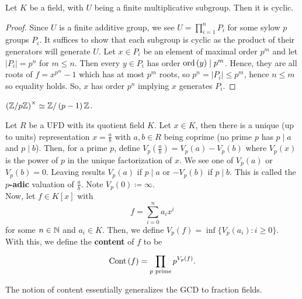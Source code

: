 \begin{theorem}
	Let \(K\) be a field, with \(U\) being a finite multiplicative subgroup. Then it is cyclic.
\end{theorem}
\begin{proof}
Since \(U\) is a finite additive group, we see \(U = \prod_{i= 1}^{n} P_{i} \) for some sylow \(p\) groups \(P_{i}\). It suffices to show that each subgroup is cyclic as the product of their generators will generate \(U\). Let \(x \in P_{i}\) be an element of maximal order \(p^{m}\) and let \(\left| P_{i} \right|= p^{n} \) for \(m \le n\). Then every \(y \in P_{i}\) has order \(\operatorname{ord}\left( y \right) \mid p^{m}\). Hence, they are all roots of \(f = x^{p^{m}} - 1\) which has at most \(p^{m}\) roots, so  \(p^{n} = \left| P_{i} \right|  \le p^{m}\), hence \(n \le m\) so equality holds. So, \(x\) has order \(p^{n}\) implying \(x\) generates \(P_{i}\).
\end{proof}
\begin{corollary}
	\(\left( \mathbb{Z} / p\mathbb{Z} \right)^{\times} \simeq \mathbb{Z} / \left( p-1 \right) \mathbb{Z} \).
\end{corollary}
\begin{definition}
Let \(R\) be a UFD with its quotient field \(K\). Let \(x \in K\), then there is a unique (up to units) representation \(x = \frac{a}{b}\) with \(a, b \in R\) being coprime (no prime \(p\) has \(p \mid a\) and \(p \mid b\)). Then, for a prime \(p\), define \(V_{p}\left( \frac{a}{b} \right)  = V_{p}\left( a \right) - V_{p}\left( b \right) \) where \(V_{p}\left( x \right) \) is the power of \(p\) in the unique factorization of \(x\). We see one of \(V_{p}\left( a \right)\) or \(V_{p}\left( b \right) = 0\). Leaving results \(V_{p}\left( a \right) \) if \(p \mid a\) or \(-V_{p}\left( b \right) \) if \(p \mid b\). This is called the \textbf{\(p\)-adic} valuation of \(\frac{a}{b}\). Note \(V_{p}\left( 0 \right)  \coloneqq \infty\).  \\
Now, let \(f \in K\left[ x \right] \) with \[
f = \sum_{i= 0}^{n} a_{i}x^{i}
\] for some \(n \in \mathbb{N}\) and \(a_{i} \in K\). Then, we define \(V_{p}\left( f \right) = \inf \{ V_{p}\left( a_{i} \right)  : i \ge 0  \} \). With this, we define the \textbf{content} of \(f\) to be \[
\operatorname{Cont} \left( f \right)  = \prod_{p \text{ prime}}^{} p^{V_{p}\left( f \right) }
.\]
\end{definition}
\begin{remark}
	The notion of content essentially generalizes the GCD to fraction fields.
\end{remark}
